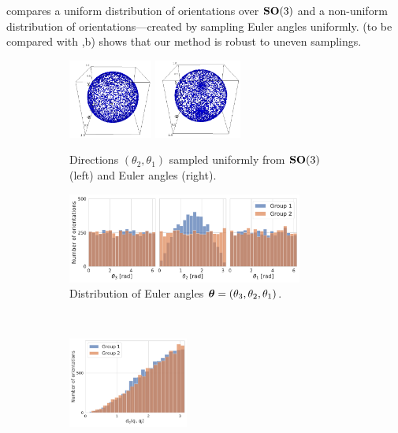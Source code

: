  compares a uniform distribution of orientations over $\mathrm{\mathbf{SO}}(3)$ and a non-uniform distribution of orientations---created by sampling Euler angles uniformly. %
 (to be compared with ,b) shows that our method is robust to uneven samplings.

\begin{figure}[ht!]
    \centering
    \begin{subfigure}[b]{0.36\linewidth}
        \centering
        \includegraphics[height=7em]{figures/uniform_quaternion.png}%
        \hspace{1em}%
        \includegraphics[height=7em]{figures/uniform_angles.png}
        \caption{Directions $(\theta_2, \theta_1)$ sampled uniformly from $\mathrm{\mathbf{SO}}(3)$ (left) and Euler angles (right).}
    \end{subfigure}
    \hspace{4em}
    \begin{subfigure}[b]{0.46\linewidth}
        \centering
        \includegraphics[height=8em]{figures/uniform_quaternions_vs_angles_ang.pdf}
        \caption{Distribution of Euler angles ${\boldsymbol{\theta}} = (\theta_3,\theta_2,\theta_1)$.}
    \end{subfigure}
    \\ \vspace{1em}
    \begin{subfigure}[b]{0.36\linewidth}
        \centering
        \includegraphics[height=8em]{figures/dQ_5j0n_uniform_quaternions_vs_angles.pdf}

\end{subfigure}
\end{figure}
